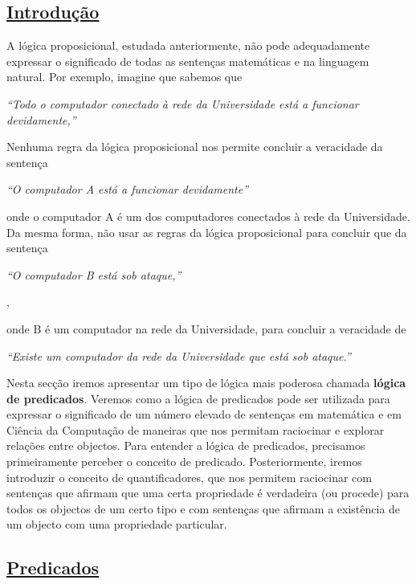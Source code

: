 \subsection*{\underline{Introdução}}

A lógica proposicional, estudada anteriormente, não pode adequadamente expressar
o significado de todas as sentenças matemáticas e na linguagem natural. Por
exemplo, imagine que sabemos que

\begin{center}\emph{``Todo o computador conectado à rede da
Universidade está a funcionar devidamente,''}\end{center}

Nenhuma regra da lógica proposicional nos permite concluir a veracidade da
sentença

\begin{center}\emph{``O computador A está a funcionar devidamente''}\end{center}

onde o computador A é um dos computadores conectados à rede da Universidade. Da
mesma forma, não usar as regras da lógica proposicional para concluir que da
sentença

\begin{center}\emph{``O computador B está sob ataque,''}\end{center},

onde B é um computador na rede da Universidade, para concluir a veracidade de

\begin{center}\emph{``Existe um computador da rede da
Universidade que está sob ataque.''}\end{center}

Nesta secção iremos apresentar um tipo de lógica mais poderosa chamada
\textbf{lógica de predicados}. Veremos como a lógica de predicados pode ser
utilizada para expressar o significado de um número elevado de sentenças em
matemática e em Ciência da Computação de maneiras que nos permitam raciocinar e
explorar relações entre objectos. Para entender a lógica de predicados,
precisamos primeiramente perceber o conceito de predicado. Posteriormente,
iremos introduzir o conceito de quantificadores, que nos permitem raciocinar com
sentenças que afirmam que uma certa propriedade é verdadeira (ou procede) para
todos os objectos de um certo tipo e com sentenças que afirmam a existência de
um objecto com uma propriedade particular.


\subsection*{\underline{Predicados}}
 
